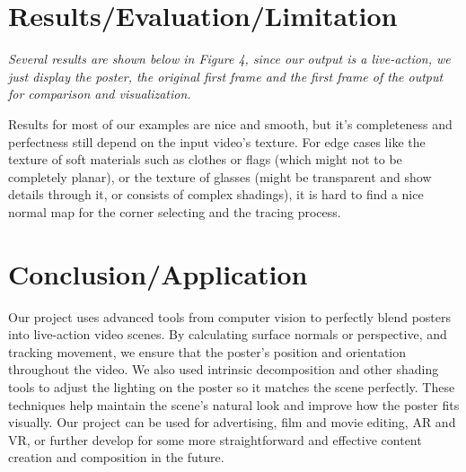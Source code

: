 \documentclass[sigconf]{acmart}
\begin{document}
\section{Results/Evaluation/Limitation}
\emph{Several results are shown below in Figure 4, since our output is a live-action, we just display the poster, the original first frame and the first frame of the output for comparison and visualization.}

Results for most of our examples are nice and smooth, but it's completeness and perfectness still depend on the input video's texture. For edge cases like the texture of soft materials such as clothes or flags (which might not to be completely planar), or the texture of glasses (might be transparent and show details through it, or consists of complex shadings), it is hard to find a nice normal map for the corner selecting and the tracing process.



\section{Conclusion/Application}

Our project uses advanced tools from computer vision to perfectly blend posters into live-action video scenes. By calculating surface normals or perspective, and tracking movement, we ensure that the poster's position and orientation throughout the video. We also used intrinsic decomposition and other shading tools to adjust the lighting on the poster so it matches the scene perfectly. These techniques help maintain the scene's natural look and improve how the poster fits visually. Our project can be used for advertising, film and movie editing, AR and VR, or further develop for some more straightforward and effective content creation and composition in the future.








\cite{bhat2023zoedepth}
\cite{careaga2023intrinsic}
\cite{eftekhar2021omnidata}
\cite{miangoleh2021boosting}
\cite{careaga2023intrinsic2}
\end{document}
